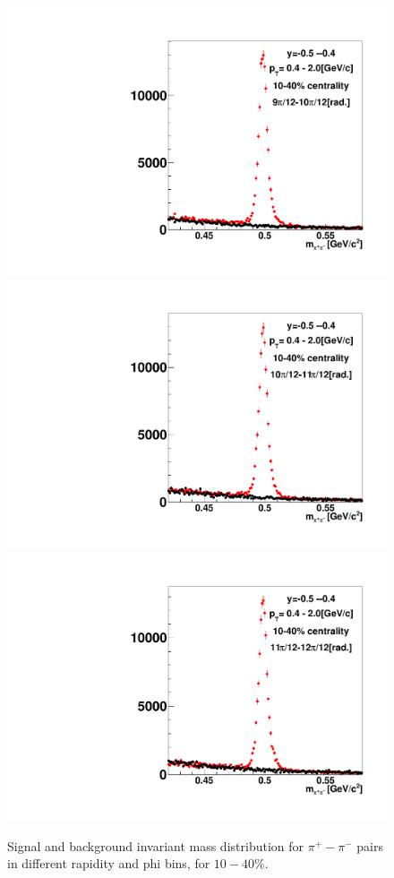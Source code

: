 \begin{figure}[h]
\includegraphics[width=0.14\linewidth]{chapterX/fig/ks_v1_sig/kf_ptslice0_cent1_ks_flow_phi10_rap9_check.pdf}
\includegraphics[width=0.14\linewidth]{chapterX/fig/ks_v1_sig/kf_ptslice0_cent1_ks_flow_phi11_rap9_check.pdf}
\includegraphics[width=0.14\linewidth]{chapterX/fig/ks_v1_sig/kf_ptslice0_cent1_ks_flow_phi12_rap9_check.pdf}

\caption{Signal and background invariant mass distribution for $\pi^{+}-\pi^{-}$ pairs in different rapidity and phi bins, for $10-40\%$.}
\label{ks_v1_sig_raw2}
\end{figure}

